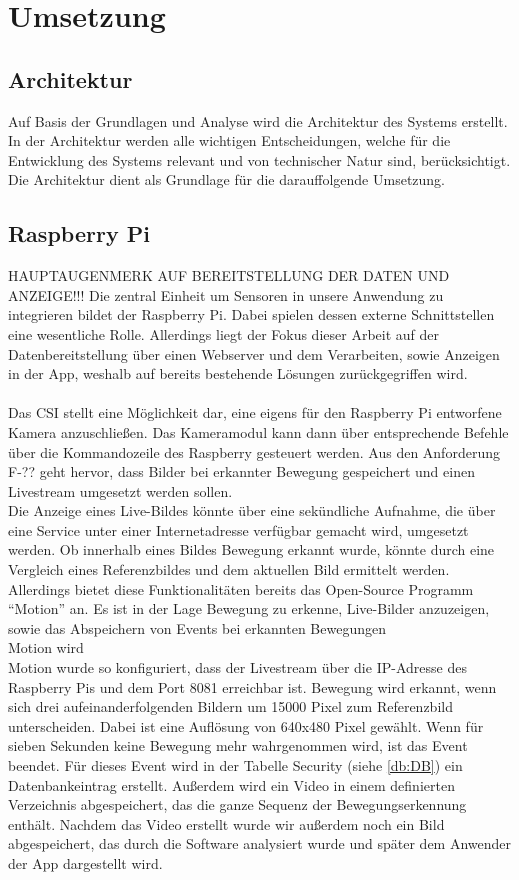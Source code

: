 \chapter{Umsetzung} \label{sec:Umsetzung}

\section{Architektur}
Auf Basis der Grundlagen und Analyse wird die Architektur des Systems erstellt.
In der Architektur werden alle wichtigen Entscheidungen, welche für die
Entwicklung des Systems relevant und von technischer Natur sind, berücksichtigt. Die Architektur dient als Grundlage für die darauffolgende Umsetzung.

\section{Raspberry Pi} HAUPTAUGENMERK AUF BEREITSTELLUNG DER DATEN UND ANZEIGE!!!
Die zentral Einheit um Sensoren in unsere Anwendung zu integrieren bildet der Raspberry Pi. Dabei spielen dessen externe Schnittstellen eine wesentliche Rolle. Allerdings liegt der Fokus dieser Arbeit auf der Datenbereitstellung über einen Webserver und dem Verarbeiten, sowie Anzeigen in der App, weshalb auf bereits bestehende Lösungen zurückgegriffen wird.
\\\\Das \acf{CSI} stellt eine Möglichkeit dar, eine eigens für den Raspberry Pi entworfene Kamera anzuschließen. Das Kameramodul kann dann über entsprechende Befehle über die Kommandozeile des Raspberry gesteuert werden. Aus den Anforderung F-?? geht hervor, dass Bilder bei erkannter Bewegung gespeichert und einen Livestream umgesetzt werden sollen.\\Die Anzeige eines Live-Bildes könnte über eine sekündliche Aufnahme, die über eine Service unter einer Internetadresse verfügbar gemacht wird, umgesetzt werden. Ob innerhalb eines Bildes Bewegung erkannt wurde, könnte durch eine Vergleich eines Referenzbildes und dem aktuellen Bild ermittelt werden.\\Allerdings bietet diese Funktionalitäten bereits das Open-Source Programm \enquote{Motion} an. Es ist in der Lage Bewegung zu erkenne, Live-Bilder anzuzeigen, sowie das Abspeichern von Events bei erkannten Bewegungen\cite{motion:Motion}\\
Motion wird 
\\Motion wurde so konfiguriert, dass der Livestream über die \ac{IP}-Adresse des Raspberry Pis und dem Port 8081 erreichbar ist. Bewegung wird erkannt, wenn sich drei aufeinanderfolgenden Bildern um 15000 Pixel zum Referenzbild unterscheiden. Dabei ist eine Auflösung von 640x480 Pixel gewählt. Wenn für sieben Sekunden keine Bewegung mehr wahrgenommen wird, ist das Event beendet. Für dieses Event wird in der Tabelle Security (siehe \autoref{db:DB}) ein Datenbankeintrag erstellt. Außerdem wird ein Video in einem definierten Verzeichnis abgespeichert, das die ganze Sequenz der Bewegungserkennung enthält. Nachdem das Video erstellt wurde wir außerdem noch ein Bild abgespeichert, das durch die Software analysiert wurde und später dem Anwender der App dargestellt wird.
